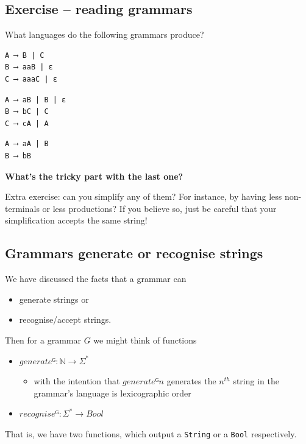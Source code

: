 \documentclass[11pt]{article}
\theoremstyle{definition}
\begin{document}
\subsection{Exercise – reading grammars}
\label{sec:org111121a}

What languages do the following grammars produce?

\begin{verbatim}
A ⟶ B | C
B ⟶ aaB | ε
C ⟶ aaaC | ε
\end{verbatim}

\begin{verbatim}
A ⟶ aB | B | ε
B ⟶ bC | C
C ⟶ cA | A
\end{verbatim}

\begin{verbatim}
A ⟶ aA | B
B ⟶ bB
\end{verbatim}

\textbf{What's the tricky part with the last one?}

Extra exercise: can you simplify any of them?
For instance, by having less non-terminals or less productions?
If you believe so, just be careful that
your simplification accepts the same string!

\subsection{Grammars generate or recognise strings}
\label{sec:orge86f80f}

We have discussed the facts that a grammar can
\begin{itemize}
\item generate strings or
\item recognise/accept strings.
\end{itemize}

Then for a grammar \(G\) we might think of functions
\begin{itemize}
\item \(generateᴳ : ℕ → Σ^{*}\)
\begin{itemize}
\item with the intention that \(generateᴳ n\) generates the \(n^{th}\)
string in the grammar's language is lexicographic order
\end{itemize}
\item \(recogniseᴳ : Σ^{*} → Bool\)
\end{itemize}
That is, we have two functions, which output a \texttt{String} or
a \texttt{Bool} respectively.
\end{document}
